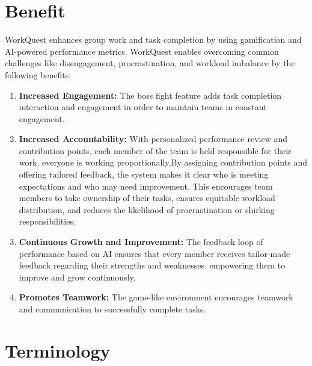 \section{Benefit}
\label{section:benefit}
WorkQuest enhances group work and task completion by using gamification and AI-powered performance metrics. WorkQuest enables overcoming common challenges like disengagement, procrastination, and workload imbalance by the following benefits:
\begin{enumerate} 
    \item \textbf{Increased Engagement:} The boss fight feature adds task completion interaction and engagement in order to maintain teams in constant engagement.
    \item \textbf{Increased Accountability:} With personalized performance review and contribution points, each member of the team is held responsible for their work. everyone is working proportionally,By assigning contribution points and offering tailored feedback, the system makes it clear who is meeting expectations and who may need improvement. This encourages team members to take ownership of their tasks, ensures equitable workload distribution, and reduces the likelihood of procrastination or shirking responsibilities.
    \item \textbf{Continuous Growth and Improvement:} The feedback loop of performance based on AI ensures that every member receives tailor-made feedback regarding their strengths and weaknesses. empowering them to improve and grow continuously.
    \item \textbf{Promotes Teamwork:} The game-like environment  encourages teamwork and communication to successfully complete tasks.
\end{enumerate}

\section{Terminology}  
\label{section:terminology}  



